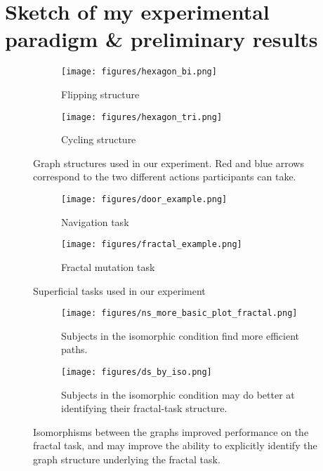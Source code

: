 \documentclass[10pt]{article}
\begin{document}
\section{Sketch of my experimental paradigm \& preliminary results}
\begin{figure}[p]
\centering
\begin{subfigure}{0.33\textwidth}
\texttt{[image: figures/hexagon\_bi.png]}
\caption{Flipping structure}
\end{subfigure}
\hspace{3em}
\begin{subfigure}{0.33\textwidth}
\texttt{[image: figures/hexagon\_tri.png]}
\caption{Cycling structure}
\end{subfigure}
\caption{Graph structures used in our experiment. Red and blue arrows correspond to the two different actions participants can take.}
\label{hexagon_diagrams}
\end{figure}
\begin{figure}[p]
\centering
\begin{subfigure}{0.33\textwidth}
\texttt{[image: figures/door\_example.png]}
\caption{Navigation task}
\end{subfigure}
\hspace{3em}
\begin{subfigure}{0.33\textwidth}
\texttt{[image: figures/fractal\_example.png]}
\caption{Fractal mutation task}
\end{subfigure}
\caption{Superficial tasks used in our experiment}
\label{tasks}
\end{figure}
\begin{figure}[p]
\centering
\begin{subfigure}{0.45\textwidth}
\texttt{[image: figures/ns\_more\_basic\_plot\_fractal.png]}
\caption{Subjects in the isomorphic condition find more efficient paths.}
\label{results_ns}
\end{subfigure}
\hspace{3em}
\begin{subfigure}{0.45\textwidth}
\texttt{[image: figures/ds\_by\_iso.png]}
\caption{Subjects in the isomorphic condition may do better at identifying their fractal-task structure.}
\label{results_ds}
\end{subfigure}
\caption{Isomorphisms between the graphs improved performance on the fractal task, and may improve the ability to explicitly identify the graph structure underlying the fractal task.}
\label{results}
\end{figure}
\end{document}
